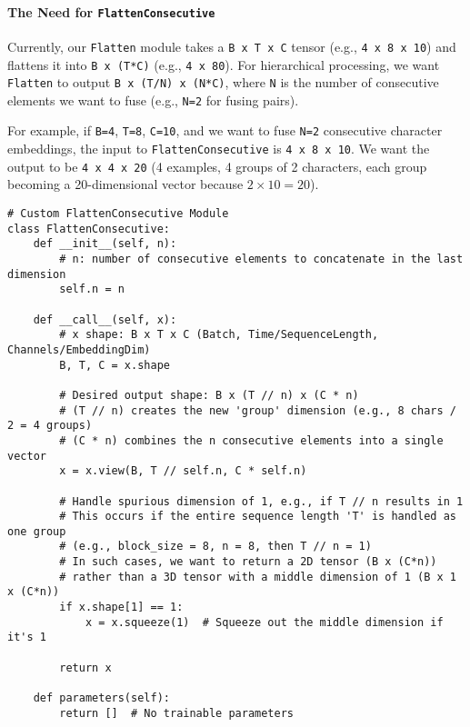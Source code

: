 \paragraph{The Need for \texttt{FlattenConsecutive}}
Currently, our \texttt{Flatten} module takes a \texttt{B x T x C} tensor (e.g., \texttt{4 x 8 x 10}) and flattens it into \texttt{B x (T*C)} (e.g., \texttt{4 x 80}). For hierarchical processing, we want \texttt{Flatten} to output \texttt{B x (T/N) x (N*C)}, where \texttt{N} is the number of consecutive elements we want to fuse (e.g., \texttt{N=2} for fusing pairs).

For example, if \texttt{B=4}, \texttt{T=8}, \texttt{C=10}, and we want to fuse \texttt{N=2} consecutive character embeddings, the input to \texttt{FlattenConsecutive} is \texttt{4 x 8 x 10}. We want the output to be \texttt{4 x 4 x 20} (4 examples, 4 groups of 2 characters, each group becoming a 20-dimensional vector because $2 \times 10 = 20$).

\begin{lstlisting}[caption={Custom FlattenConsecutive Module}]
# Custom FlattenConsecutive Module
class FlattenConsecutive:
    def __init__(self, n):
        # n: number of consecutive elements to concatenate in the last dimension
        self.n = n

    def __call__(self, x):
        # x shape: B x T x C (Batch, Time/SequenceLength, Channels/EmbeddingDim)
        B, T, C = x.shape

        # Desired output shape: B x (T // n) x (C * n)
        # (T // n) creates the new 'group' dimension (e.g., 8 chars / 2 = 4 groups)
        # (C * n) combines the n consecutive elements into a single vector
        x = x.view(B, T // self.n, C * self.n)

        # Handle spurious dimension of 1, e.g., if T // n results in 1
        # This occurs if the entire sequence length 'T' is handled as one group
        # (e.g., block_size = 8, n = 8, then T // n = 1)
        # In such cases, we want to return a 2D tensor (B x (C*n))
        # rather than a 3D tensor with a middle dimension of 1 (B x 1 x (C*n))
        if x.shape[1] == 1:
            x = x.squeeze(1)  # Squeeze out the middle dimension if it's 1

        return x

    def parameters(self):
        return []  # No trainable parameters
\end{lstlisting}


